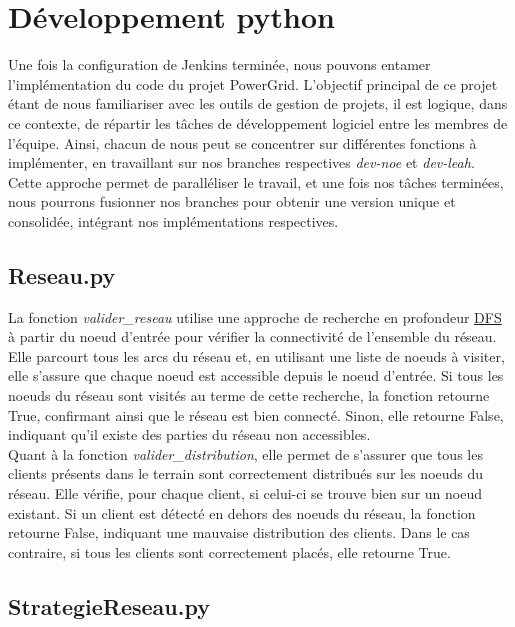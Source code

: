 \section{Développement python}

Une fois la configuration de Jenkins terminée, nous pouvons entamer l’implémentation du code du projet PowerGrid. L'objectif principal de ce projet étant de nous familiariser avec les outils de gestion de projets, il est logique, dans ce contexte, de répartir les tâches de développement logiciel entre les membres de l’équipe.
Ainsi, chacun de nous peut se concentrer sur différentes fonctions à implémenter, en travaillant sur nos branches respectives \textit{dev-noe} et \textit{dev-leah}.
Cette approche permet de paralléliser le travail, et une fois nos tâches terminées, nous pourrons fusionner nos branches pour obtenir une version unique et consolidée, intégrant nos implémentations respectives.

\subsection{Reseau.py}

La fonction \textit{valider\_reseau} utilise une approche de recherche en profondeur \href{https://fr.wikipedia.org/wiki/Algorithme_de_parcours_en_profondeur}{DFS}
 à partir du noeud d'entrée pour vérifier la connectivité de l'ensemble du réseau. Elle parcourt tous les arcs du réseau et, en utilisant une liste de noeuds à visiter, elle s'assure que chaque noeud est accessible depuis le noeud d'entrée. Si tous les noeuds du réseau sont visités au terme de cette recherche, la fonction retourne True, confirmant ainsi que le réseau est bien connecté. Sinon, elle retourne False, indiquant qu'il existe des parties du réseau non accessibles.
\\

Quant à la fonction \textit{valider\_distribution}, elle permet de s'assurer que tous les clients présents dans le terrain sont correctement distribués sur les noeuds du réseau. Elle vérifie, pour chaque client, si celui-ci se trouve bien sur un noeud existant. Si un client est détecté en dehors des noeuds du réseau, la fonction retourne False, indiquant une mauvaise distribution des clients. Dans le cas contraire, si tous les clients sont correctement placés, elle retourne True.

\subsection{StrategieReseau.py}

